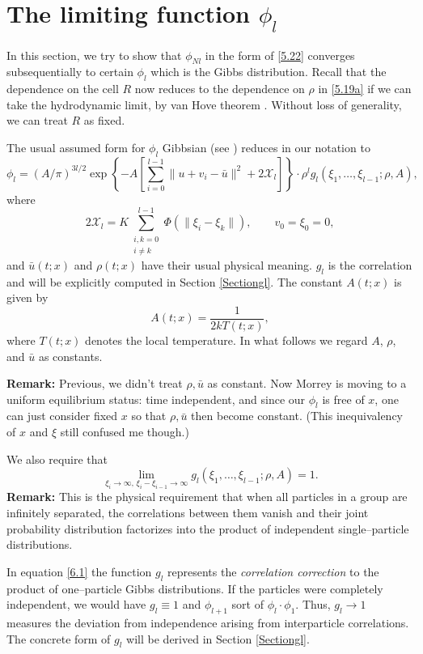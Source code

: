 \documentclass[11pt]{article}
\begin{document}
\section{The limiting function $\phi_l$}\label{Section:limit}
In this section, we try to show that $\phi_{Nl}$ in the form of \eqref{5.22} converges subsequentially to certain $\phi_l$ which is the Gibbs distribution. Recall that the dependence on the cell $R$ now reduces to the dependence on $\rho$ in \eqref{5.19a} if we can take the hydrodynamic limit, by van Hove theorem \cite{Ruelle1969}. Without loss of generality, we can treat $R$ as fixed.

The usual assumed form for $\phi_l$ Gibbsian (see \cite[Chapter 6]{BornGreen1949})
reduces in our notation to
\begin{equation}
  \phi_l = (A/\pi)^{3l/2}
  \exp\!\left\{
    -A\!\left[
      \sum_{i=0}^{l-1} \|u + v_i - \bar{u}\|^2 + 2\mathcal{X}_l
    \right]
  \right\}
  \cdot \rho^l g_l(\xi_1, \dots, \xi_{l-1}; \rho, A),
  \tag{6.1}\label{6.1}
\end{equation}
where
\[
  2\mathcal{X}_l = K\sum_{\substack{i,k=0\\ i \neq k}}^{l-1} \Phi(\|\xi_i - \xi_k\|),
  \qquad
  v_0 = \xi_0 = 0,
\]
and $\bar{u}(t;x)$ and $\rho(t;x)$ have their usual physical meaning. $g_l$ is the correlation and will be explicitly computed in Section \ref{Sectiongl}.  The constant $A(t;x)$ is given by
\[
  A(t;x) = \frac{1}{2kT(t;x)},
\]
where $T(t;x)$ denotes the local temperature.
In what follows we regard $A$, $\rho$, and $\bar{u}$ as constants.

\textbf{Remark:} Previous, we didn't treat $\rho,\bar{u}$ as constant. Now Morrey is moving to a uniform equilibrium status: time independent, and since our $\phi_l$ is free of $x$, one can just consider fixed $x$ so that $\rho, \bar{u}$ then become constant. (This inequivalency of $x$ and $\xi$ still confused me though.)

We also require that
\begin{equation}
  \lim_{\xi_i \to \infty, \, \xi_i - \xi_{i-1} \to \infty}
  g_l(\xi_1, \dots, \xi_{l-1}; \rho, A) = 1.
  \tag{6.2}\label{6.2}
\end{equation}
\textbf{Remark:}
This is the physical requirement that when all particles in a group are infinitely separated, the correlations between them vanish and their joint probability distribution factorizes into the product of independent single--particle distributions.

In equation \eqref{6.1} the function $g_l$ represents the \emph{correlation correction}
to the product of one--particle Gibbs distributions. 
If the particles were completely independent, we would have $g_l \equiv 1 $ and $ \phi_{l+1}$ sort of $\phi_l\cdot\phi_1$. 
Thus, $g_l \rightarrow 1$ measures the deviation from independence
arising from interparticle correlations. The concrete form of $g_l$ will be derived in Section \ref{Sectiongl}.
\end{document}
